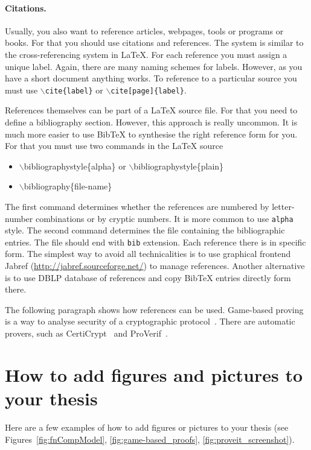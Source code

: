 \documentclass[12pt]{article}
\begin{document}
\paragraph{Citations.}
Usually, you also want to reference articles, webpages, tools or programs or books. For that you should use citations and references. The system is similar to the cross-referencing system in LaTeX. For each reference you must assign a unique label. Again, there are many naming schemes for labels. However, as you have a short document anything works. To reference to a particular source you must use \texttt{$\backslash$cite\{label\}} or \texttt{$\backslash$cite[page]\{label\}}. 

References themselves can be part of a LaTeX source file. For that you need to define a bibliography section. However, this approach is really uncommon. It is much more easier to use BibTeX to synthesise the right reference form for you. For that you must use two commands in the LaTeX source
\begin{itemize}
\item $\backslash$bibliographystyle\{alpha\} or $\backslash$bibliographystyle\{plain\}
\item $\backslash$bibliography\{file-name\}
\end{itemize}
The first command determines whether the references are numbered by letter-number combinations or by cryptic numbers. It is more common to use \texttt{alpha} style. The second command determines the file containing the bibliographic entries. The file should end with \texttt{bib} extension. Each reference there is in specific form. The simplest way to avoid all technicalities is to use graphical frontend  Jabref (\url{http://jabref.sourceforge.net/}) to manage references. Another alternative is to use DBLP database of references and copy BibTeX entries directly form there.   
    
   
The following paragraph shows how references can be used. Game-based proving is a way to analyse security of a cryptographic protocol~\cite{GameB_1, GameB_2}. There are automatic provers, such as {CertiCrypt\-}~\cite{dummy} and ProVerif~\cite{proVerif}.


\newpage
\section{How to add figures and pictures to your thesis}


Here are a few examples of how to add figures or pictures to your thesis (see Figures~\ref{fig:fnCompModel}, \ref{fig:game-based_proofs}, \ref{fig:proveit_screenshot}).
\end{document}
